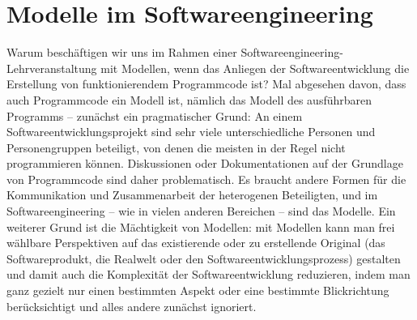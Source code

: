 \cleardoublepage
\chapter{Modelle im Softwareengineering}
\label{sec:Kap-3}

Warum beschäftigen wir uns im Rahmen einer Softwareengineering-Lehr\-ver\-an\-stal\-tung mit Modellen, wenn das Anliegen der Softwareentwicklung die Erstellung von funktionierendem Programmcode ist? Mal abgesehen davon, dass auch Programmcode ein Modell ist, nämlich das Modell des ausführbaren Programms – zunächst ein pragmatischer Grund: 
An einem Softwareentwicklungsprojekt sind sehr viele unterschiedliche Personen und Personengruppen beteiligt, von denen die meisten in der Regel nicht programmieren können. Diskussionen oder Dokumentationen auf der Grundlage von Programmcode sind daher problematisch. Es braucht andere Formen für die Kommunikation und Zusammenarbeit der heterogenen Beteiligten, und im Softwareengineering – wie in vielen anderen Bereichen – sind das Modelle. Ein weiterer Grund ist die Mächtigkeit von Modellen: mit Modellen kann man frei wählbare Perspektiven auf das existierende oder zu erstellende Original (\zb das Softwareprodukt, die Realwelt oder den Softwareentwicklungsprozess) gestalten und damit auch die Komplexität der Softwareentwicklung reduzieren, indem man ganz gezielt nur einen bestimmten Aspekt oder eine bestimmte Blickrichtung berücksichtigt und alles andere zunächst ignoriert.



\clearpage


\clearpage







\clearpage
